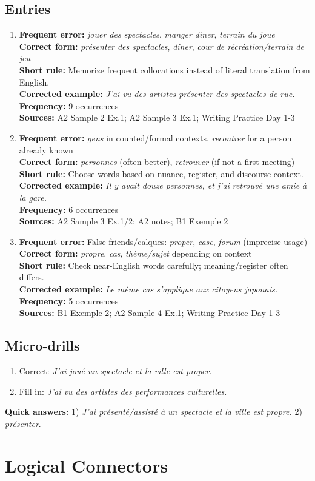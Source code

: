 \documentclass{article}
\newcommand{\mistakeentry}[6]{
\item \textbf{Frequent error:} #1\\
\textbf{Correct form:} #2\\
\textbf{Short rule:} #3\\
\textbf{Corrected example:} #4\\
\textbf{Frequency:} #5\\
\textbf{Sources:} #6
}
\begin{document}
\subsection*{Entries}
\begin{enumerate}
    \mistakeentry
    {\textit{jouer des spectacles}, \textit{manger diner}, \textit{terrain du joue}}
    {\textit{présenter des spectacles}, \textit{dîner}, \textit{cour de récréation/terrain de jeu}}
    {Memorize frequent collocations instead of literal translation from English.}
    {\textit{J'ai vu des artistes présenter des spectacles de rue.}}
    {9 occurrences}
    {A2 Sample 2 Ex.1; A2 Sample 3 Ex.1; Writing Practice Day 1-3}

    \mistakeentry
    {\textit{gens} in counted/formal contexts, \textit{recontrer} for a person already known}
    {\textit{personnes} (often better), \textit{retrouver} (if not a first meeting)}
    {Choose words based on nuance, register, and discourse context.}
    {\textit{Il y avait douze personnes, et j'ai retrouvé une amie à la gare.}}
    {6 occurrences}
    {A2 Sample 3 Ex.1/2; A2 notes; B1 Exemple 2}

    \mistakeentry
    {False friends/calques: \textit{proper}, \textit{case}, \textit{forum} (imprecise usage)}
    {\textit{propre}, \textit{cas}, \textit{thème/sujet} depending on context}
    {Check near-English words carefully; meaning/register often differs.}
    {\textit{Le même cas s'applique aux citoyens japonais.}}
    {5 occurrences}
    {B1 Exemple 2; A2 Sample 4 Ex.1; Writing Practice Day 1-3}
\end{enumerate}

\subsection*{Micro-drills}
\begin{enumerate}
    \item Correct: \textit{J'ai joué un spectacle et la ville est proper.}
    \item Fill in: \textit{J'ai vu des artistes \underline{\hspace{2cm}} des performances culturelles.}
\end{enumerate}
\textbf{Quick answers:} 1) \textit{J'ai présenté/assisté à un spectacle et la ville est propre.} 2) \textit{présenter}.

\section{Logical Connectors}
\end{document}
